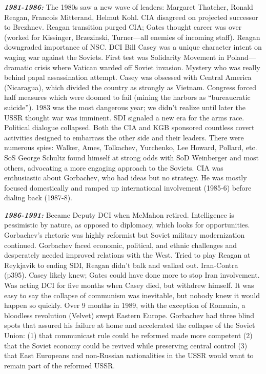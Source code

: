 \documentclass[
]{article}
\begin{document}
\textbf{\emph{1981-1986:}} The 1980s saw a new wave of leaders: Margaret
Thatcher, Ronald Reagan, Francois Mitterand, Helmut Kohl. CIA disagreed
on projected successor to Brezhnev. Reagan transition purged CIA; Gates
thought career was over (worked for Kissinger, Brzezinski, Turner---all
enemies of incoming staff). Reagan downgraded importance of NSC. DCI
Bill Casey was a unique character intent on waging war against the
Soviets. First test was Solidarity Movement in Poland---dramatic crisis
where Vatican warded off Soviet invasion. Mystery who was really behind
papal assassination attempt. Casey was obsessed with Central America
(Nicaragua), which divided the country as strongly as Vietnam. Congress
forced half measures which were doomed to fail (mining the harbors as
``bureaucratic suicide''). 1983 was the most dangerous year; we didn't
realize until later the USSR thought war was imminent. SDI signaled a
new era for the arms race. Political dialogue collapsed. Both the CIA
and KGB sponsored countless covert activities designed to embarrass the
other side and their leaders. There were numerous spies: Walker, Ames,
Tolkachev, Yurchenko, Lee Howard, Pollard, etc. SoS George Schultz found
himself at strong odds with SoD Weinberger and most others, advocating a
more engaging approach to the Soviets. CIA was enthusiastic about
Gorbachev, who had ideas but no strategy. He was mostly focused
domestically and ramped up international involvement (1985-6) before
dialing back (1987-8).

\textbf{\emph{1986-1991:}} Became Deputy DCI when McMahon retired.
Intelligence is pessimistic by nature, as opposed to diplomacy, which
looks for opportunities. Gorbachev's rhetoric was highly reformist but
Soviet military modernization continued. Gorbachev faced economic,
political, and ethnic challenges and desperately needed improved
relations with the West. Tried to play Reagan at Reykjavik to ending
SDI, Reagan didn't balk and walked out. Iran-Contra (p395). Casey likely
knew; Gates could have done more to stop Iran involvement. Was acting
DCI for five months when Casey died, but withdrew himself. It was easy
to say the collapse of communism was inevitable, but nobody knew it
would happen so quickly. Over 9 months in 1989, with the exception of
Romania, a bloodless revolution (Velvet) swept Eastern Europe. Gorbachev
had three blind spots that assured his failure at home and accelerated
the collapse of the Soviet Union: (1) that communicast rule could be
reformed made more competent (2) that the Soviet economy could be
revived while preserving central control (3) that East Europeans and
non-Russian nationalities in the USSR would want to remain part of the
reformed USSR.
\end{document}
